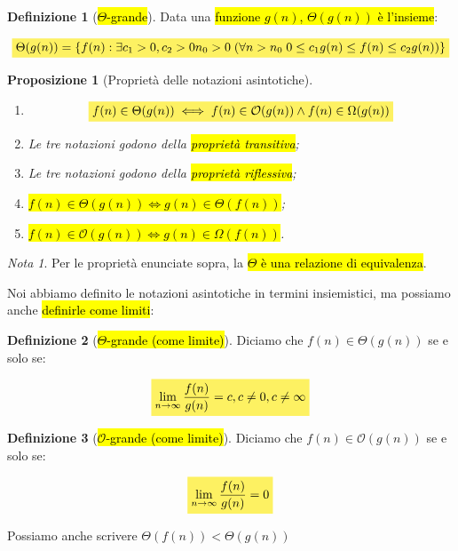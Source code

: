 \documentclass[a4paper,11pt,twoside]{article}
\theoremstyle{plain}
\newtheorem{prop}{Proposizione}[section]
\theoremstyle{definition}
\newtheorem{defn}{Definizione}[section]
\theoremstyle{remark}
\newtheorem*{nota}{Nota}
\newcommand{\mhl}[1]{\colorbox{hlcolor}{$\displaystyle #1$}}
\begin{document}
\begin{defn}[\hl{$\Theta$-grande}]\label{def:theta-grande}
  Data una \hl{funzione $g(n)$, $\Theta(g(n))$ è l'insieme}:

  \begin{equation}
    \mhl{
      \Theta(g(n)) = \{ f(n) : \exists c_1>0, c_2>0 n_0>0 \; (\forall n>n_0 \;
        0 \leq c_1 g(n) \leq f(n) \leq c_2 g(n)) \}
    }
  \end{equation}
\end{defn}

\begin{prop}[Proprietà delle notazioni asintotiche]
  \begin{enumerate}
    \item
      \[
        \mhl{
          f(n) \in \Theta(g(n)) \iff f(n) \in \mathcal{O}(g(n)) \land
          f(n) \in \Omega(g(n))
        }
      \]
    \item Le tre notazioni godono della \hl{proprietà transitiva};
    \item Le tre notazioni godono della \hl{proprietà riflessiva};
    \item \hl{$f(n) \in \Theta(g(n)) \iff g(n) \in \Theta(f(n))$};
    \item \hl{$f(n) \in \mathcal{O}(g(n)) \iff g(n) \in \Omega(f(n))$}.
  \end{enumerate}
\end{prop}

\begin{nota}
  Per le proprietà enunciate sopra, la \hl{$\Theta$ è una relazione di
  equivalenza}.
\end{nota}

Noi abbiamo definito le notazioni asintotiche in termini insiemistici, ma
possiamo anche \hl{definirle come limiti}:

\begin{defn}[\hl{$\Theta$-grande (come limite)}]\label{def:theta-grande-lim}
  Diciamo che $f(n) \in \Theta(g(n))$ se e solo se:

  \begin{equation}
    \mhl{
      \lim_{n \to \infty} \frac{f(n)}{g(n)} = c , c \neq 0, c \neq \infty
    }
  \end{equation}
\end{defn}

\begin{defn}[\hl{$\mathcal{O}$-grande (come limite)}]\label{def:o-grande-lim}
  Diciamo che $f(n) \in \mathcal{O}(g(n))$ se e solo se:

  \begin{equation}
    \mhl{
      \lim_{n \to \infty} \frac{f(n)}{g(n)} = 0
    }
  \end{equation}

  Possiamo anche scrivere $\Theta(f(n)) < \Theta(g(n))$
\end{defn}
\end{document}
